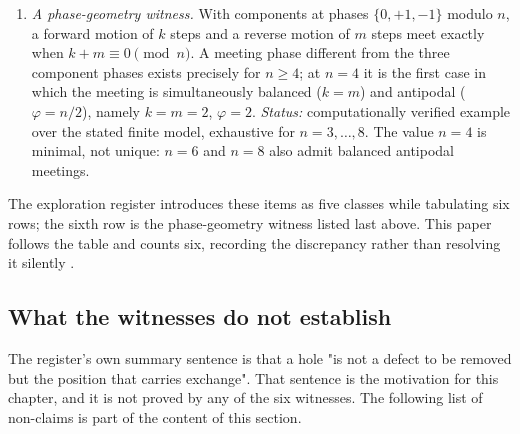 \begin{enumerate}
  \item \emph{A phase-geometry witness.}  With components at phases
  $\{0,+1,-1\}$ modulo $n$, a forward motion of $k$ steps and a reverse motion of
  $m$ steps meet exactly when $k+m\equiv0\pmod n$.  A meeting phase different
  from the three component phases exists precisely for $n\ge4$; at $n=4$ it is
  the first case in which the meeting is simultaneously balanced ($k=m$) and
  antipodal ($\varphi=n/2$), namely $k=m=2$, $\varphi=2$.  \emph{Status:}
  computationally verified example over the stated finite model, exhaustive for
  $n=3,\ldots,8$.  The value $n=4$ is minimal, not unique: $n=6$ and $n=8$ also
  admit balanced antipodal meetings.
\end{enumerate}

\begin{remark}
\label{rem:p0-holed-register-bookkeeping}
The exploration register introduces these items as five classes while tabulating
six rows; the sixth row is the phase-geometry witness listed last above.  This
paper follows the table and counts six, recording the discrepancy rather than
resolving it silently \cite{Yuan2026AEGHoleRegister}.
\end{remark}

\subsection{What the witnesses do not establish}
\label{subsec:p0-holed-nonclaims}

The register's own summary sentence is that a hole "is not a defect to be
removed but the position that carries exchange".  That sentence is the
motivation for this chapter, and it is not proved by any of the six witnesses.
The following list of non-claims is part of the content of this section.

